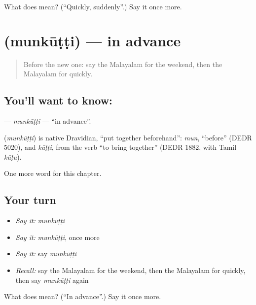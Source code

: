 \begin{tcolorbox}[breakable,colback=teal!4,colframe=teal!35!black,title={Before you move on}]
What does  mean? (\textquotedblleft{}Quickly, suddenly\textquotedblright{}.) Say it once more.
\end{tcolorbox}
\section[\texorpdfstring{\ml{മുൻകൂട്ടി} (munkūṭṭi)}{മുൻകൂട്ടി (munkūṭṭi)}]{ (munkūṭṭi) — in advance}

\label{lesson:ML-C195-munkutti}



\begin{quote}
Before the new one: say the Malayalam for the weekend, then the Malayalam for quickly.
\end{quote}

\subsection*{You'll want to know: }
\textbf{} — \emph{munkūṭṭi} — \textquotedblleft{}in advance\textquotedblright{}.

\begin{cousinweb}
\textbf{} (\emph{munkūṭṭi}) is native Dravidian, \textquotedblleft{}put together beforehand\textquotedblright{}: \emph{mun}, \textquotedblleft{}before\textquotedblright{} (DEDR 5020), and \emph{kūṭṭi}, from the verb \textquotedblleft{}to bring together\textquotedblright{} (DEDR 1882, with Tamil \emph{kūṭu}).
\end{cousinweb}

\begin{grammarlens}[title={What you've built}]
One more word for this chapter.
\end{grammarlens}

\subsection*{Your turn}
\begin{itemize}
\raggedright
  \item \emph{Say it:} \emph{munkūṭṭi}
  \item \emph{Say it:} \emph{munkūṭṭi}, once more
  \item \emph{Say it:} say \emph{munkūṭṭi}
  \item \emph{Recall:} say the Malayalam for the weekend, then the Malayalam for quickly, then say \emph{munkūṭṭi} again
\end{itemize}

\begin{tcolorbox}[breakable,colback=teal!4,colframe=teal!35!black,title={Before you move on}]
What does  mean? (\textquotedblleft{}In advance\textquotedblright{}.) Say it once more.
\end{tcolorbox}
